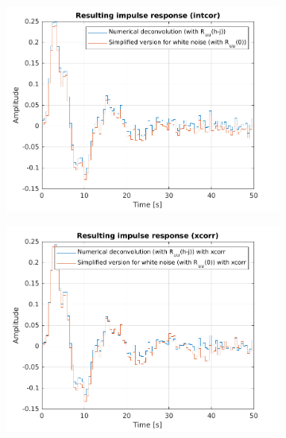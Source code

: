 \documentclass{scrartcl}
\begin{document}
\begin{figure}[h!]
	\centering
	\begin{subfigure}{0.49\textwidth}
		\includegraphics[width=\textwidth]{figures/impulse_response_intcor.pdf}
		\label{fig:impulse_response_intcor}
	\end{subfigure}
	\begin{subfigure}{0.49\textwidth}
		\includegraphics[width=\textwidth]{figures/impulse_response_xcorr.pdf}
		\label{fig:impulse_response_xcorr}
	\end{subfigure}
	\begin{subfigure}{\textwidth}

\end{subfigure}
\end{figure}
\end{document}
